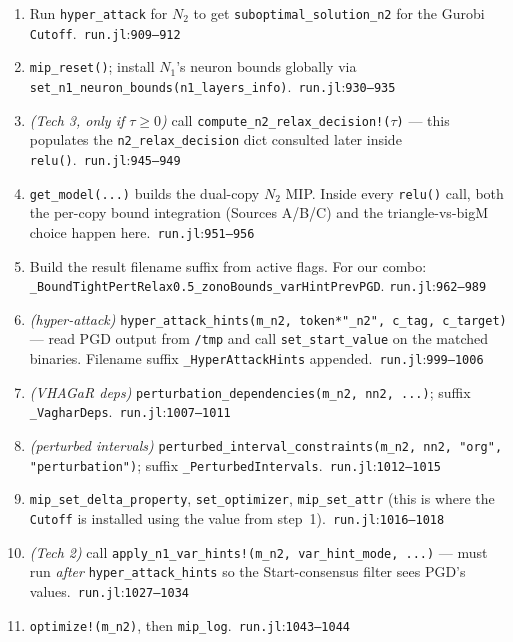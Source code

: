 \documentclass[11pt]{article}
\newcommand{\src}[1]{\texttt{\small #1}}
\newcommand{\fileline}[2]{\src{#1}:\src{#2}}
\begin{document}
\begin{enumerate}[leftmargin=2em, itemsep=2pt, label=\arabic*.]
  \item Run \src{hyper\_attack} for $N_2$ to get
    \src{suboptimal\_solution\_n2} for the Gurobi
    \texttt{Cutoff}.~\fileline{run.jl}{909--912}
  \item \src{mip\_reset()}; install $N_1$'s neuron bounds globally
    via \src{set\_n1\_neuron\_bounds(n1\_layers\_info)}.~\fileline{run.jl}{930--935}
  \item \emph{(Tech 3, only if $\tau\ge 0$)} call
    \src{compute\_n2\_relax\_decision!($\tau$)}
    --- this populates the \src{n2\_relax\_decision} dict consulted
    later inside \src{relu()}.~\fileline{run.jl}{945--949}
  \item \src{get\_model(...)} builds the dual-copy $N_2$ MIP. Inside
    every \src{relu()} call, both the per-copy bound integration
    (Sources A/B/C) and the triangle-vs-bigM choice happen
    here.~\fileline{run.jl}{951--956}
  \item Build the result filename suffix from active flags.
    For our combo: \src{\_BoundTightPertRelax0.5\_zonoBounds\_varHintPrevPGD}.
    \fileline{run.jl}{962--989}
  \item \emph{(hyper-attack)} \src{hyper\_attack\_hints(m\_n2,
    token*"\_n2", c\_tag, c\_target)} — read PGD output from
    \src{/tmp} and call \src{set\_start\_value} on the matched binaries.
    Filename suffix \src{\_HyperAttackHints} appended.~\fileline{run.jl}{999--1006}
  \item \emph{(VHAGaR deps)} \src{perturbation\_dependencies(m\_n2,
    nn2, ...)}; suffix \src{\_VagharDeps}.~\fileline{run.jl}{1007--1011}
  \item \emph{(perturbed intervals)}
    \src{perturbed\_interval\_constraints(m\_n2, nn2, "org",
    "perturbation")}; suffix \src{\_PerturbedIntervals}.~\fileline{run.jl}{1012--1015}
  \item \src{mip\_set\_delta\_property}, \src{set\_optimizer},
    \src{mip\_set\_attr} (this is where the \texttt{Cutoff} is
    installed using the value from step~1).~\fileline{run.jl}{1016--1018}
  \item \emph{(Tech 2)} call
    \src{apply\_n1\_var\_hints!(m\_n2, var\_hint\_mode, ...)} ---
    must run \emph{after} \src{hyper\_attack\_hints} so the
    Start-consensus filter sees PGD's values.~\fileline{run.jl}{1027--1034}
  \item \src{optimize!(m\_n2)}, then \src{mip\_log}.~\fileline{run.jl}{1043--1044}
\end{enumerate}
\end{document}
